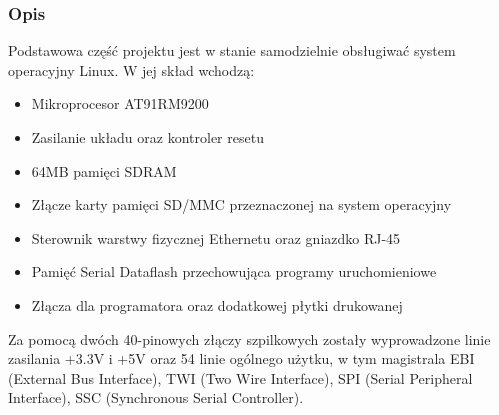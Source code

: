\documentclass[a4paper,12pt]{book}
\begin{document}
				\subsubsection{Opis}
					Podstawowa część projektu jest w stanie samodzielnie obsługiwać system operacyjny Linux. W jej skład wchodzą:
					\begin{itemize}
						\item Mikroprocesor AT91RM9200
						\item Zasilanie układu oraz kontroler resetu
					\item 64MB pamięci SDRAM
						\item Złącze karty pamięci SD/MMC przeznaczonej na system operacyjny
						\item Sterownik warstwy fizycznej Ethernetu oraz gniazdko RJ-45
						\item Pamięć Serial Dataflash przechowująca programy uruchomieniowe
						\item Złącza dla programatora oraz dodatkowej płytki drukowanej
					\end{itemize}
					Za pomocą dwóch 40-pinowych złączy szpilkowych zostały wyprowadzone linie zasilania +3.3V i +5V oraz 54 linie ogólnego użytku, w tym magistrala EBI (External Bus Interface), TWI (Two Wire Interface), SPI (Serial Peripheral Interface), SSC (Synchronous Serial Controller).\\
\end{document}
